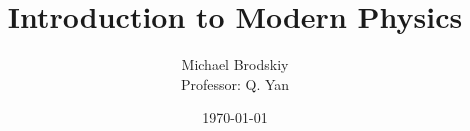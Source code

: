 


\title{Introduction to Modern Physics}
\date{\today}
\author{Michael Brodskiy\\ \small Professor: Q. Yan}



\maketitle

